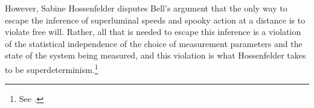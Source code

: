 However, Sabine Hossenfelder disputes Bell's argument that the only way to escape the inference of superluminal speeds and spooky action at a distance is to violate free will. Rather, all that is needed to escape this inference is a violation of the statistical independence of the choice of measurement parameters and the state of the system being measured, and this violation is what Hossenfelder takes to be superdeterminism.\footnote{ See \cite{superdeterminism}.   }


\begin{comment}

more reasonable. For example, in the case where the choice is made before it is determined which  system is to be measured, and the system  if wouldn't be clear $\lambda$ for which system would be affected
For if this probability $p_\lambda$ did depend on the choice that was to be made on the system, then we could  envisage a system $\mathcal{S}$ consisting of two entangled particles which Alice and Bob measure separately. If Bob's choice of measurement affected the probability distribution of $p_\lambda$, then it would seem that the effect of Bob's measurement could propagate to Alice faster than the speed of light.\footnote{Recall from the discussion on page \pageref{lambdaknowledge}, that in considering any possible violation of relativity,   it is irrelevant whether Alice knows the hidden variable $\lambda$ and hence whether Alice could work out which measurement Bob had made, because Alice's state of knowledge shouldn't have any effect on the speed at which Bob's effect is propagated. But if she did know $\lambda$, after enough measurements, she would be able to work out the distribution $p_\lambda$, and so if this distribution depended on Bob's choice, she would be able to say something about the choice he made.} Adherents of relativity theory would therefore not want to reject criterion \ref{hidden5}.


We should also state explicitly a fifth criterion for hidden variables as a condition for the possibility :
\begin{enumerate}
	\setcounter{enumi}{4}
	\item \label{hidden5} Suppose  $\mathcal{A}$ is any system that is entangled with $\mathcal{S}$, and that the quantum state of the composite system $\mathcal{S}+\mathcal{A}$  is $\ket{\phi}_{\mathcal{S}+\mathcal{A}}$. Then for any measurement $O_\mathcal{S}$ on $\mathcal{S}$ and $O_\mathcal{A}$ on $\mathcal{A}$, there is a probability for the joint measurement of $O_\mathcal{S}$ and $O_\mathcal{A}$ on $\mathcal{S}+\mathcal{A}$ that is a function of $\lambda$  despite $\lambda$ only referring to the system $\mathcal{S}$.	
\end{enumerate}
\end{comment}

